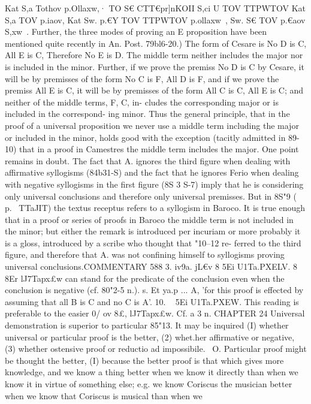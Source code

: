 {{{{{{{{{{{{{{{{{{{{{{{{{{{{{{{Kat S,a Tothov p.Ollaxw,· TO S€ CTT€pr]nKOII S,ci U TOV TTPWTOV Kat S,a
TOV p.iaov, Kat Sw. p.€Y TOV TTPWTOV p.ollaxw~, Sw. S€ TOV p.€aov S,xw~.
Further, the three modes of proving an E proposition have been
mentioned quite recently in An. Post. 79bl6-20.) The form of
Cesare is No D is C, All E is C, Therefore No E is D. The middle
term neither includes the major nor is included in the minor.
Further, if we prove the premiss No D is C by Cesare, it will be
by premisses of the form No C is F, All D is F, and if we
prove the premiss All E is C, it will be by premisses of the form
All C is C, All E is C; and neither of the middle terms, F, C, in-
cludes the corresponding major or is included in the correspond-
ing minor.
Thus the general principle, that in the proof of a universal
proposition we never use a middle term including the major
or included in the minor, holds good with the exception (tacitly
admitted in 89-10) that in a proof in Camestres the middle term
includes the major.
One point remains in doubt. The fact that A. ignores the third
figure when dealing with affirmative syllogisms (84b31-S) and the
fact that he ignores Ferio when dealing with negative syllogisms
in the first figure (8S 3 S-7) imply that he is considering only
universal conclusions and therefore only universal premisses.
But in 8S"9 (~ p.~ TTaJIT{) the textus receptus refers to a syllogism
in Baroco. It is true enough that in a proof or series of proofs
in Baroco the middle term is not included in the minor; but
either the remark is introduced per incuriam or more probably
it is a gloss, introduced by a scribe who thought that "10--12 re-
ferred to the third figure, and therefore that A. was not confining
himself to syllogisms proving universal conclusions.COMMENTARY
588
3. iv9a. jL€v 8 5Ei U1Ta.PXELV. 8 8Er lJ7Tapx£w can stand for the
predicate of the conclusion even when the conclusion is negative
(cf. 80"2-5 n.).
s. Et ya.p ... A, 'for this proof is effected by assuming that
all B is C and no C is A'.
10. ~ 5Ei U1Ta.PXEW. This reading is preferable to the easier
0/ ov 8£, lJ7Tapx£w. Cf. a 3 n.
CHAPTER 24
Universal demonstration is superior to particular
85"13. It may be inquired (I) whether universal or particular
proof is the better, (2) whet.her affirmative or negative, (3)
whether ostensive proof or reductio ad impossibile.
~O. Particular proof might be thought the better, (I) because
the better proof is that which gives more knowledge, and we know
a thing better when we know it directly than when we know it
in virtue of something else; e.g. we know Coriscus the musician
better when we know that Coriscus is musical than when we
}}}}}}}}}}}}}}}}}}}}}}}}}}}}}}}}

